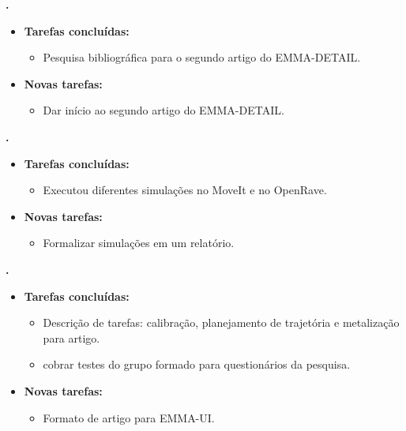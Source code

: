 	
	  \textbf{\elael.} 
	\begin{itemize}
		\item \textbf{Tarefas concluídas:}
			\begin{itemize}    
				\item Pesquisa bibliográfica para o segundo artigo do
				EMMA-DETAIL.
			\end{itemize}
		
		\item \textbf{Novas tarefas:}
			\begin{itemize} 
			    \item Dar início ao segundo artigo do EMMA-DETAIL.
			\end{itemize}
	\end{itemize}			
			
  \textbf{\renan.} 
	\begin{itemize}
		\item \textbf{Tarefas concluídas:}
			\begin{itemize}    
				\item Executou diferentes simulações no MoveIt e no OpenRave.
			\end{itemize}
		
		\item \textbf{Novas tarefas:}
			\begin{itemize} 
			    \item Formalizar simulações em um relatório.
			\end{itemize}
	\end{itemize}	
			
   \textbf{\julia.} 
	\begin{itemize}
		\item \textbf{Tarefas concluídas:}
			\begin{itemize}    
				\item Descrição de tarefas: calibração, planejamento de trajetória e metalização para artigo.
				\item cobrar testes do grupo formado para questionários da pesquisa.
			\end{itemize}
		
		\item \textbf{Novas tarefas:}
			\begin{itemize} 
			    \item Formato de artigo para EMMA-UI.
			\end{itemize}
	\end{itemize}		



